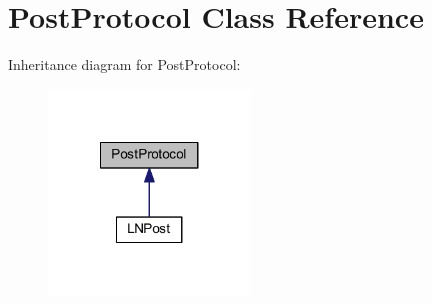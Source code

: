 \hypertarget{class_post_protocol}{\section{Post\-Protocol Class Reference}
\label{class_post_protocol}
}


Inheritance diagram for Post\-Protocol\-:\nopagebreak
\begin{figure}[H]
\begin{center}
\leavevmode
\includegraphics[width=152pt]{class_post_protocol__inherit__graph}
\end{center}
\end{figure}
